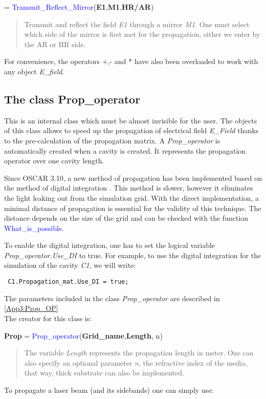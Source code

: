 = \textcolor{blue}{Transmit\_Reflect\_Mirror}(\textbf{E1},\textbf{M1},\textbf{HR/AR})
\vspace*{-0.2cm}
\begin{quote}
Transmit and reflect the field \textsl{E1} through a mirror \textsl{M1}. One must select which side of the mirror is first met for the propagation, either we enter by the AR or HR side.
\end{quote}

For convenience, the operators +,- and * have also been overloaded to work with any object \textsl{E\_field}.

\subsection{The class Prop\_operator}
\label{Sec:DI}
This is an internal class which must be almost invisible for the user. The objects of this class allows to speed up the propagation of electrical field \textsl{E\_Field} thanks to the pre-calculation of the propagation matrix. A \textsl{Prop\_operator} is automatically created when a cavity is created. It represents the propagation operator over one cavity length.

Since OSCAR 3.10, a new method of propagation has been implemented based on the method of digital integration \cite{DI_paper}. This method is slower, however it eliminates the light leaking out from the simulation grid. With the direct implementation, a minimal distance of propagation is essential for the validity of this technique. The distance depends on the size of the grid and can be checked with the function \textcolor{blue}{What\_is\_possible}.

To enable the digital integration, one has to set the logical variable \textsl{Prop\_operator.Use\_DI} to true. For example, to use the digital integration for the simulation of the cavity \textsl{C1}, we will write:

\verb? C1.Propagation_mat.Use_DI = true; ?

The parameters included in the class \textsl{Prop\_operator} are described in \ref{App3:Prop_OP}\\


The creator for this class is:

\noindent \textbf{Prop} = \textcolor{blue}{Prop\_operator}(\textbf{Grid\_name},\textbf{Length}, n)

\vspace*{-0.2cm}
\begin{quote}
The variable \textsl{Length} represents the propagation length in meter. One can also specify an optional parameter \textsl{n}, the refractive index of the media, that way, thick substrate can also be implemented.
\end{quote}
To propagate a laser beam (and its sidebands) one can simply use:

